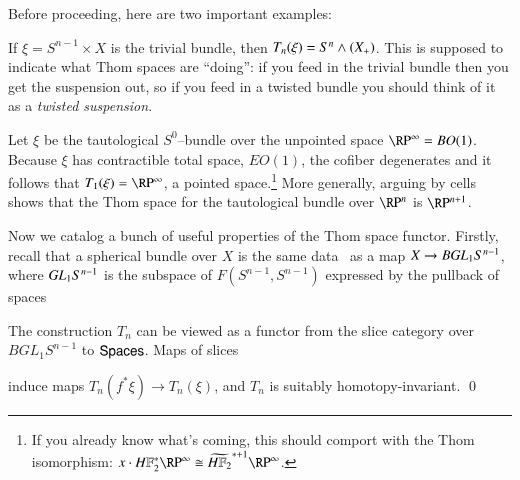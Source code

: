 Before proceeding, here are two important examples:
\begin{example}\label{TrivialBundleThomExample}
If $\xi = S^{n-1} \times X$ is the trivial bundle, then $T_n(\xi) = S^n \wedge (X_+)$.  This is supposed to indicate what Thom spaces are ``doing'': if you feed in the trivial bundle then you get the suspension out, so if you feed in a twisted bundle you should think of it as a \textit{twisted suspension}.
\end{example}

\begin{example}\label{RPnThomExample}
Let $\xi$ be the tautological $S^0$--bundle over the unpointed space $\RP^\infty = BO(1)$.  Because $\xi$ has contractible total space, $EO(1)$, the cofiber degenerates and it follows that $T_1(\xi) = \RP^\infty$, a pointed space.\footnote{If you already know what's coming, this should comport with the Thom isomorphism: $x \cdot \HFtwo^* \RP^\infty \cong \widetilde{\HFtwo}^{* + 1} \RP^\infty$.}  More generally, arguing by cells shows that the Thom space for the tautological bundle over $\RP^n$ is $\RP^{n+1}$.
\end{example}

Now we catalog a bunch of useful properties of the Thom space functor.  Firstly, recall that a spherical bundle over $X$ is the same data~\cite{MayClassifyingSpaces} as a map $X \to B \mathit{GL}_1 S^{n-1}$, where $\mathit{GL}_1 S^{n-1}$ is the subspace of $F(S^{n-1}, S^{n-1})$ expressed by the pullback of spaces
\begin{center}
\end{center}

\begin{lemma}\label{ThomConstructionIsASliceFunctor}
The construction $T_n$ can be viewed as a functor from the slice category over $BGL_1 S^{n-1}$ to $\mathsf{Spaces}$.  Maps of slices
\begin{center}
\end{center}
induce maps $T_n(f^* \xi) \to T_n(\xi)$, and $T_n$ is suitably homotopy-invariant. \qed
\end{lemma}


